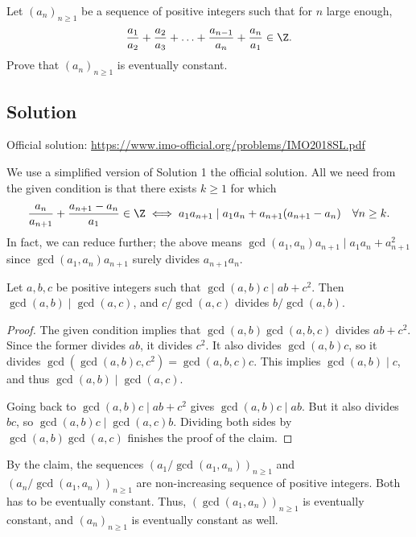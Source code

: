 Let $(a_n)_{n \geq 1}$ be a sequence of positive integers such that for $n$ large enough,
\[ \frac{a_1}{a_2} + \frac{a_2}{a_3} + \ldots + \frac{a_{n - 1}}{a_n} + \frac{a_n}{a_1} \in \Z. \]
Prove that $(a_n)_{n \geq 1}$ is eventually constant.



\subsection*{Solution}

Official solution: \url{https://www.imo-official.org/problems/IMO2018SL.pdf}

We use a simplified version of Solution 1 the official solution.
All we need from the given condition is that there exists $k \geq 1$ for which
\[ \frac{a_n}{a_{n + 1}} + \frac{a_{n + 1} - a_n}{a_1} \in \Z \iff a_1 a_{n + 1} \mid a_1 a_n + a_{n + 1} (a_{n + 1} - a_n) \quad \forall n \geq k. \]
In fact, we can reduce further; the above means $\gcd(a_1, a_n) a_{n + 1} \mid a_1 a_n + a_{n + 1}^2$ since $\gcd(a_1, a_n) a_{n + 1}$ surely divides $a_{n + 1} a_n$.

\begin{claim}
Let $a, b, c$ be positive integers such that $\gcd(a, b) c \mid ab + c^2$.
Then $\gcd(a, b) \mid \gcd(a, c)$, and $c/\gcd(a, c)$ divides $b/\gcd(a, b)$.
\end{claim}
\begin{proof}
The given condition implies that $\gcd(a, b) \gcd(a, b, c)$ divides $ab + c^2$.
Since the former divides $ab$, it divides $c^2$.
It also divides $\gcd(a, b) c$, so it divides $\gcd(\gcd(a, b) c, c^2) = \gcd(a, b, c) c$.
This implies $\gcd(a, b) \mid c$, and thus $\gcd(a, b) \mid \gcd(a, c)$.

Going back to $\gcd(a, b) c \mid ab + c^2$ gives $\gcd(a, b) c \mid ab$.
But it also divides $bc$, so $\gcd(a, b) c \mid \gcd(a, c) b$.
Dividing both sides by $\gcd(a, b) \gcd(a, c)$ finishes the proof of the claim.
\end{proof}

By the claim, the sequences $(a_1/\gcd(a_1, a_n))_{n \geq 1}$ and $(a_n/\gcd(a_1, a_n))_{n \geq 1}$ are non-increasing sequence of positive integers.
Both has to be eventually constant.
Thus, $(\gcd(a_1, a_n))_{n \geq 1}$ is eventually constant, and $(a_n)_{n \geq 1}$ is eventually constant as well.
